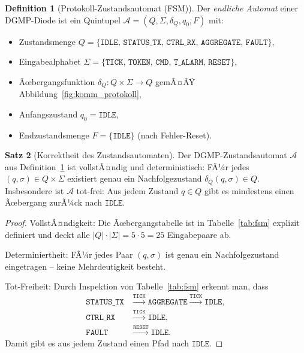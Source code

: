 ﻿\documentclass[a4paper,12pt]{article}
\theoremstyle{definition}
\newtheorem{definition}{Definition}[section]
\newtheorem{satz}[definition]{Satz}
\theoremstyle{remark}
\begin{document}
\begin{definition}[Protokoll-Zustandsautomat (FSM)]
\label{def:fsm}
Der \emph{endliche Automat} einer DGMP-Diode ist ein Quintupel
$\mathcal{A} = (Q, \Sigma, \delta_Q, q_0, F)$ mit:
\begin{itemize}
  \item Zustandsmenge $Q = \{\mathtt{IDLE},\, \mathtt{STATUS\_TX},\,
    \mathtt{CTRL\_RX},\, \mathtt{AGGREGATE},\, \mathtt{FAULT}\}$,
  \item Eingabealphabet $\Sigma = \{\mathtt{TICK},\, \mathtt{TOKEN},\,
    \mathtt{CMD},\, \mathtt{T\_ALARM},\, \mathtt{RESET}\}$,
  \item Ãœbergangsfunktion $\delta_Q: Q \times \Sigma \to Q$ gemÃ¤ÃŸ
    Abbildung~\ref{fig:komm_protokoll},
  \item Anfangszustand $q_0 = \mathtt{IDLE}$,
  \item Endzustandsmenge $F = \{\mathtt{IDLE}\}$ (nach Fehler-Reset).
\end{itemize}
\end{definition}

\begin{satz}[Korrektheit des Zustandsautomaten]
\label{satz:fsm_korrektheit}
Der DGMP-Zustandsautomat $\mathcal{A}$ aus Definition~\ref{def:fsm}
ist vollstÃ¤ndig und deterministisch: FÃ¼r jedes $(q, \sigma) \in Q \times \Sigma$
existiert genau ein Nachfolgezustand $\delta_Q(q, \sigma) \in Q$.
Insbesondere ist $\mathcal{A}$ tot-frei: Aus jedem Zustand $q \in Q$ gibt
es mindestens einen Ãœbergang zurÃ¼ck nach $\mathtt{IDLE}$.
\end{satz}

\begin{proof}
VollstÃ¤ndigkeit: Die Ãœbergangstabelle ist in Tabelle~\ref{tab:fsm} explizit
definiert und deckt alle $|Q| \cdot |\Sigma| = 5 \cdot 5 = 25$ Eingabepaare ab.

Determiniertheit: FÃ¼r jedes Paar $(q, \sigma)$ ist genau ein Nachfolgezustand
eingetragen -- keine Mehrdeutigkeit besteht.

Tot-Freiheit: Durch Inspektion von Tabelle~\ref{tab:fsm} erkennt man, dass
\begin{align*}
  \mathtt{STATUS\_TX} &\xrightarrow{\mathtt{TICK}} \mathtt{AGGREGATE}
                       \xrightarrow{\mathtt{TICK}} \mathtt{IDLE}, \\
  \mathtt{CTRL\_RX}   &\xrightarrow{\mathtt{TICK}} \mathtt{IDLE}, \\
  \mathtt{FAULT}      &\xrightarrow{\mathtt{RESET}} \mathtt{IDLE}.
\end{align*}
Damit gibt es aus jedem Zustand einen Pfad nach $\mathtt{IDLE}$. \qedhere
\end{proof}
\end{document}
